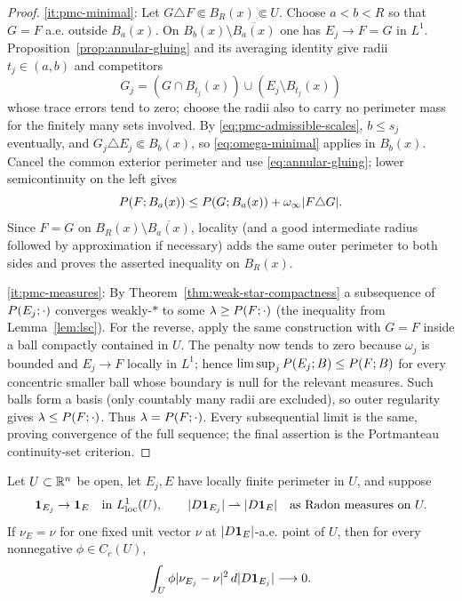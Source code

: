 \begin{proof}
\ref{it:pmc-minimal}: Let $G\triangle F\Subset B_R(x)\Subset U$.  Choose
$a<b<R$ so that $G=F$ a.e. outside $B_a(x)$.  On
$B_b(x)\setminus\overline{B_a(x)}$ one has $E_j\to F=G$ in $L^1$.
Proposition~\ref{prop:annular-gluing} and its averaging identity give radii
$t_j\in(a,b)$ and competitors
\[
  G_j=(G\cap B_{t_j}(x))\cup(E_j\setminus B_{t_j}(x))
\]
whose trace errors tend to zero; choose the radii also to carry no perimeter
mass for the finitely many sets involved.  By
\eqref{eq:pmc-admissible-scales}, $b\le s_j$ eventually, and
$G_j\triangle E_j\Subset B_b(x)$, so \eqref{eq:omega-minimal} applies in
$B_b(x)$.  Cancel the common exterior perimeter and use
\eqref{eq:annular-gluing}; lower semicontinuity on the left gives
\[
  P(F;B_a(x))\le P(G;B_a(x))
       +\omega_\infty|F\triangle G|.
\]
Since $F=G$ on $B_R(x)\setminus\overline{B_a(x)}$, locality (and a good
intermediate radius followed by approximation if necessary) adds the same
outer perimeter to both sides and proves the asserted inequality on $B_R(x)$.

\ref{it:pmc-measures}: By Theorem~\ref{thm:weak-star-compactness} a
subsequence of $P(E_j;\cdot)$ converges weakly-$*$ to some $\lambda\ge
P(F;\cdot)$ (the inequality from Lemma~\ref{lem:lsc}).  For the reverse,
apply the same construction with $G=F$ inside a ball compactly contained in
$U$.  The penalty now tends to zero because $\omega_j$ is bounded and
$E_j\to F$ locally in $L^1$; hence
$\limsup_jP(E_j;B)\le P(F;B)$ for every concentric smaller ball whose
boundary is null for the relevant measures.  Such balls form a basis (only
countably many radii are excluded), so outer regularity gives
$\lambda\le P(F;\cdot)$.  Thus $\lambda=P(F;\cdot)$.  Every
subsequential limit is the same, proving convergence of the full sequence;
the final assertion is the Portmanteau continuity-set criterion.
\end{proof}

\begin{lemma}
\label{lem:fixed-normal-excess-convergence}
Let $U\subset\mathbb R^n$ be open, let $E_j,E$ have locally finite perimeter in $U$,
and suppose
\[
 \mathbf 1_{E_j}\to\mathbf 1_{E}\quad\text{in }L^1_{\mathrm{loc}}(U),
 \qquad
 |D\mathbf 1_{E_j}|\rightharpoonup|D\mathbf 1_{E}|\quad\text{as Radon measures on }U.
\]
If $\nu_E=\nu$ for one fixed unit vector $\nu$ at
$|D\mathbf 1_{E}|$-a.e. point of $U$, then for every nonnegative
$\phi\in C_c(U)$,
\begin{equation}\label{eq:fixed-normal-excess-convergence}
 \int_U\phi|\nu_{E_j}-\nu|^2\,d|D\mathbf 1_{E_j}|\longrightarrow0.
\end{equation}
\end{lemma}

